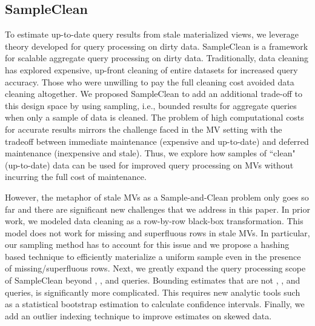 \subsection{SampleClean~\cite{wang1999sample}}
To estimate up-to-date query results from stale materialized views, we leverage theory developed for query processing on dirty data.
SampleClean is a framework for scalable aggregate query processing on dirty data.
Traditionally, data cleaning has explored expensive, up-front cleaning of entire datasets for increased query accuracy.
Those who were unwilling to pay the full cleaning cost avoided data cleaning altogether.
We proposed SampleClean to add an additional trade-off to this design space by using sampling, i.e., bounded results for aggregate queries when only a sample of data is cleaned.
The problem of high computational costs for accurate results mirrors the challenge faced in the MV setting with the tradeoff between immediate maintenance (expensive and up-to-date) and deferred maintenance (inexpensive and stale). 
Thus, we explore how samples of ``clean" (up-to-date) data can be used for improved query processing on MVs without incurring the full cost of maintenance.

However, the metaphor of stale MVs as a Sample-and-Clean problem only goes so far and there are significant new challenges that we address in this paper.
In prior work, we modeled data cleaning as a row-by-row black-box transformation.
This model does not work for missing and superfluous rows in stale MVs.
In particular, our sampling method has to account for this issue and we propose a hashing based technique to efficiently materialize a uniform sample even in the presence of missing/superfluous rows.
Next, we greatly expand the query processing scope of SampleClean beyond \sumfunc, \countfunc, and \avgfunc queries.
Bounding estimates that are not \sumfunc, \countfunc, and \avgfunc queries, is significantly more complicated.
This requires new analytic tools such as a statistical bootstrap estimation to calculate confidence intervals.
Finally, we add an outlier indexing technique to improve estimates on skewed data.


